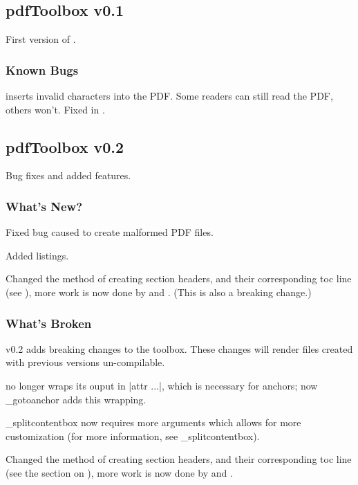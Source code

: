 \subsection{pdfToolbox v0.1} 

First version of \pdftoolbox.

\subsubsection{Known Bugs}

\blist
    \item \macro\url{} inserts invalid characters into the PDF.
        Some readers can still read the PDF, others won't.
        Fixed in .
\elist

\subsection{pdfToolbox v0.2} 

Bug fixes and added features.

\subsubsection{What's New?}

\blist
    \item Fixed bug caused \macro\url{} to create malformed PDF files.
    \item Added listings.
    \item Changed the method of creating section headers, and their corresponding toc line (see ), more work is now done by \gotomacro\settocdepthformat{} and \gotomacro\addtoccontent.
        (This is also a breaking change.)
\elist

\subsubsection{What's Broken}

\pdftoolbox{} v0.2 adds breaking changes to the toolbox.
These changes will render files created with previous versions un-compilable.
\blist
    \item \macro\linkborder{} no longer wraps its ouput in \inlinecode|attr {...}|, which is necessary for anchors;
        now \macro\_gotoanchor{} adds this wrapping.
    \item \macro\_splitcontentbox{} now requires more arguments which allows for more customization (for more information, see \gotomacro\_splitcontentbox).
    \item Changed the method of creating section headers, and their corresponding toc line (see the section on ),
        more work is now done by \gotomacro\settocdepthformat{} and \gotomacro\addtoccontent.
\elist

